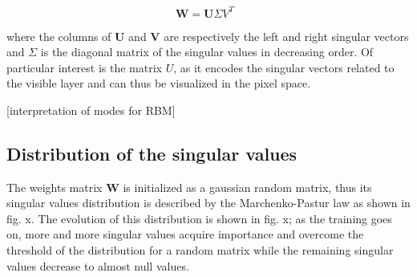 \documentclass[twocolumn]{article}
\begin{document}
\begin{equation}
\textbf{W} = \textbf{U\(\Sigma V^T \) } 
\end{equation}

where the columns of \textbf{U} and \textbf{V} are respectively the left and right singular vectors and \textbf{\(\Sigma\)} is the diagonal matrix of the singular values in decreasing order. Of particular interest is the matrix \(U\), as it encodes the singular vectors related to the visible layer and can thus be visualized in the pixel space.

[interpretation of modes for RBM]

\subsection{Distribution of the singular values}
The weights matrix \(\textbf{W}\) is initialized as a gaussian random matrix, thus its singular values distribution is described by the Marchenko-Pastur law as shown in fig. x. The evolution of this distribution is shown in fig. x; as the training goes on, more and more singular values acquire importance and overcome the threshold of the distribution for a random matrix while the remaining singular values decrease to almost null values.


\end{document}
